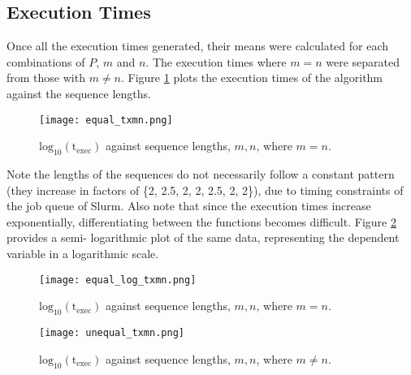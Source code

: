 \documentclass[usletter, 11pt]{extarticle}
\begin{document}
        \subsection{Execution Times} Once all the execution times generated,
        their means were calculated for each combinations of $P$, $m$ and $n$.
        The execution times where $m = n$ were separated from those with $m \ne
        n$. Figure \ref{equal} plots the execution times of the algorithm
        against the sequence lengths.

        \begin{figure}[ht]
            \begin{center}
                \texttt{[image: equal\_txmn.png]}
                \caption{$\text{log}_{10}(\text{t}_{\text{exec}})$ against
                sequence lengths, $m,n$, where $m=n$.} \label{equal}
            \end{center}
        \end{figure}

        Note the lengths of the sequences do not necessarily follow a constant
        pattern (they increase in factors of \{2, 2.5, 2, 2, 2.5, 2, 2\}), due
        to timing constraints of the job queue of Slurm. Also note that since
        the execution times increase exponentially, differentiating between the
        functions becomes difficult. Figure \ref{equal_log} provides a semi-
        logarithmic plot of the same data, representing the dependent variable
        in a logarithmic scale.

        \begin{figure}[ht]
            \begin{center}
                \texttt{[image: equal\_log\_txmn.png]}
                \caption{$\text{log}_{10}(\text{t}_{\text{exec}})$ against
                sequence lengths, $m,n$, where $m=n$.} \label{equal_log}
            \end{center}
        \end{figure}

        \begin{figure}[ht]
            \begin{center}
                \texttt{[image: unequal\_txmn.png]}
                \caption{$\text{log}_{10}(\text{t}_{\text{exec}})$ against
                sequence lengths, $m,n$, where $m\ne n$. } \label{unequal}
            \end{center}
        \end{figure}
\end{document}
